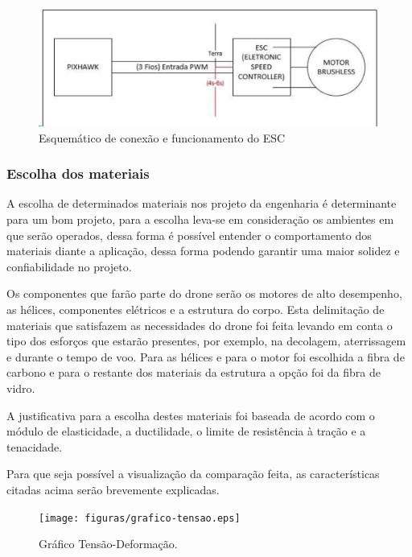 \begin{figure}[H]
    \centering
      \includegraphics[keepaspectratio=true,scale=0.5]{figuras/elice.eps}
     \caption{Esquemático  de conexão e funcionamento  do ESC\cite{dji}}
    \label{fig:diagramaEstru}
\end{figure}

\subsubsection{Escolha dos materiais}

A escolha de determinados materiais nos projeto da engenharia é determinante para um bom projeto, para a escolha leva-se em  consideração os ambientes em que serão operados, dessa forma é possível entender o comportamento dos materiais diante a aplicação, dessa forma podendo garantir uma maior solidez e confiabilidade no projeto.

Os componentes que farão parte do drone serão os motores de alto desempenho, as hélices, componentes elétricos e a estrutura do corpo. Esta delimitação de materiais que satisfazem as necessidades do drone foi feita levando  em conta o tipo dos esforços que estarão  presentes,  por exemplo, na decolagem, aterrissagem  e durante o tempo  de voo. Para as hélices e para  o motor foi escolhida  a fibra de carbono  e para  o restante dos materiais da estrutura a opção foi da fibra de vidro.

A justificativa para a escolha destes materiais foi baseada de acordo com o módulo de elasticidade, a ductilidade, o limite de resistência à tração e a tenacidade. 

Para que seja possível a visualização da comparação feita, as características citadas acima serão brevemente explicadas.


\begin{figure}[H]
    \centering
      \texttt{[image: figuras/grafico-tensao.eps]}
    \caption{Gráfico Tensão-Deformação.}
    \label{fig:grafico-tensao}
\end{figure}

